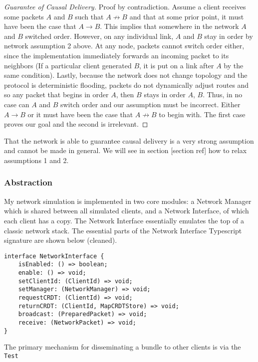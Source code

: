 \documentclass[12pt,a4paper,twoside,openright]{report}
\begin{document}
		\begin{proof}[Guarantee of Causal Delivery]
			Proof by contradiction. Assume a client receives some packets $A$ and $B$ such that $A \not\rightarrow B$ and that at some prior point, it must have been the case that $A \rightarrow B$. This implies that somewhere in the network $A$ and $B$ switched order. However, on any individual link, $A$ and $B$ stay in order by network assumption 2 above. At any node, packets cannot switch order either, since the implementation immediately forwards an incoming packet to its neighbors (If a particular client generated $B$, it is put on a link after $A$ by the same condition). Lastly, because the network does not change topology and the protocol is deterministic flooding, packets do not dynamically adjust routes and so any packet that begins in order $A$, then $B$ stays in order $A$, $B$. Thus, in no case can $A$ and $B$ switch order and our assumption must be incorrect. Either $A \rightarrow B$ or it must have been the case that $A \not\rightarrow B$ to begin with. The first case proves our goal and the second is irrelevant.
		\end{proof}
		
		That the network is able to guarantee causal delivery is a very strong assumption and cannot be made in general. We will see in section [section ref] how to relax assumptions 1 and 2.
		
		\subsubsection{Abstraction}
		My network simulation is implemented in two core modules: a Network Manager which is shared between all simulated clients, and a Network Interface, of which each client has a copy. The Network Interface essentially emulates the top of a classic network stack. The essential parts of the Network Interface Typescript signature are shown below (cleaned).
		
\begin{lstlisting}[caption=NetworkInterface Type Signature]
interface NetworkInterface {
	isEnabled: () => boolean;
	enable: () => void;
	setClientId: (ClientId) => void;
	setManager: (NetworkManager) => void;
	requestCRDT: (ClientId) => void;
	returnCRDT: (ClientId, MapCRDTStore) => void;
	broadcast: (PreparedPacket) => void;
	receive: (NetworkPacket) => void;
}
\end{lstlisting}

		The primary mechanism for disseminating a bundle to other clients is via the \lstinline|Test|
		
\end{document}

